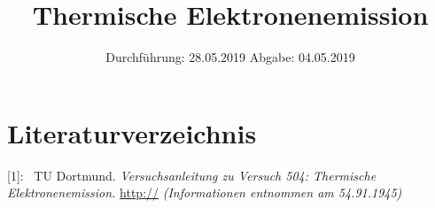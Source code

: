 

\subject{Nr.504}
\title{Thermische Elektronenemission}
\date{
  Durchführung: 28.05.2019
  \hspace{3em}
  Abgabe: 04.05.2019
}



\maketitle
\thispagestyle{empty}
\tableofcontents
\newpage






\section{Literaturverzeichnis}

[1]: \ TU Dortmund. \textit{Versuchsanleitung zu Versuch 504:
Thermische Elektronenemission.}\newline
\url{http://}
\textit{(Informationen entnommen am 54.91.1945)}\newline

\printbibliography{}


